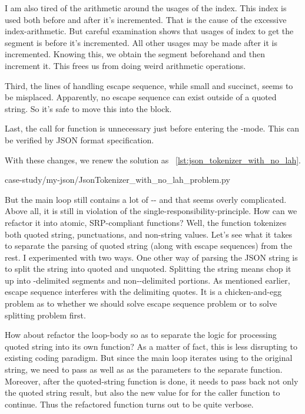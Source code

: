 I am also tired of the arithmetic around the usages of the index.
This index is used both before and after it's incremented.
That is the cause of the excessive index-arithmetic.
But careful examination shows that usages of index to get the segment is before it's incremented.
All other usages may be made after it is incremented.
Knowing this, we obtain the segment beforehand and then increment it.
This frees us from doing weird arithmetic operations.

Third, the lines of handling escape sequence, while small and succinct, seems to be misplaced.
Apparently, no escape sequence can exist outside of a quoted string.
So it's safe to move this into the  block.

Last, the call for function  is unnecessary just before entering the
-mode.
This can be verified by JSON format specification.

With these changes, we renew the solution as ~\autoref{lst:json_tokenizer_with_no_lah}.


{case-study/my-json/JsonTokenizer_with_no_lah_problem.py}

But the main loop still contains a lot of -- and that seems overly
complicated.
Above all, it is still in violation of the single-responsibility-principle.
How can we refactor it into atomic, SRP-compliant functions?
Well, the function  tokenizes both quoted string, punctuations,
and non-string values.
Let's see what it takes to separate the parsing of quoted string (along with escape sequences) from
the rest.
I experimented with two ways.
One other way of parsing the JSON string is to split the string into quoted and unquoted.
Splitting the string means chop it up into -delimited segments and non--delimited
portions.
As mentioned earlier, escape sequence  interferes with the delimiting quotes.
It is a chicken-and-egg problem as to whether we should solve escape sequence problem or
to solve splitting problem first.

How about refactor the loop-body so as to separate the logic for processing quoted string into
its own function?
As a matter of fact, this is less disrupting to existing coding paradigm.
But since the main loop iterates using  to the original string, we need to pass
 as well as  as the parameters to the separate function.
Moreover, after the quoted-string function is done, it needs to pass back not only the quoted
string result, but also the new value for
 for the caller function to continue.
Thus the refactored function turns out to be quite verbose.

